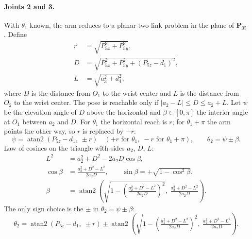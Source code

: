\documentclass[11pt]{article}
\newcommand{\atantwo}{\operatorname{atan2}}
\begin{document}
\paragraph{Joints 2 and 3.} With $\theta_1$ known, the arm reduces to a planar two-link problem in the plane of $\bm{P}_{05}$. Define
\begin{align}
r &= \sqrt{P_{5x}^2+P_{5y}^2}, \\
D &= \sqrt{P_{5x}^2+P_{5y}^2+(P_{5z}-d_1)^2}, \\
L &= \sqrt{a_3^2+d_4^2},
\end{align}
where $D$ is the distance from $O_1$ to the wrist center and $L$ is the distance from $O_2$ to the wrist center. The pose is reachable only if $|a_2-L|\le D\le a_2+L$. Let $\psi$ be the elevation angle of $D$ above the horizontal and $\beta\in[0,\pi]$ the interior angle at $O_1$ between $a_2$ and $D$. For $\theta_1$ the horizontal reach is $r$; for $\theta_1+\pi$ the arm points the other way, so $r$ is replaced by $-r$:
\begin{equation}
\psi = \atantwo\!\left(P_{5z}-d_1,\; \pm r\right) \quad (+r \text{ for } \theta_1,\; -r \text{ for } \theta_1+\pi), \qquad \theta_2 = \psi \pm \beta .
\end{equation}
Law of cosines on the triangle with sides $a_2$, $D$, $L$:
\begin{align}
L^2 &= a_2^2 + D^2 - 2a_2 D\cos\beta, \\
\cos\beta &= \frac{a_2^2+D^2-L^2}{2a_2D}, \qquad
\sin\beta = +\sqrt{1-\cos^2\beta}, \\
\beta &= \atantwo\!\left(\sqrt{1-\left(\tfrac{a_2^2+D^2-L^2}{2a_2D}\right)^{2}},\; \tfrac{a_2^2+D^2-L^2}{2a_2D}\right).
\end{align}
The only sign choice is the $\pm$ in $\theta_2=\psi\pm\beta$:
\begin{equation}
\theta_2 = \atantwo\!\left(P_{5z}-d_1,\; \pm r\right) \pm \atantwo\!\left(\sqrt{1-\left(\tfrac{a_2^2+D^2-L^2}{2a_2D}\right)^{2}},\; \tfrac{a_2^2+D^2-L^2}{2a_2D}\right).
\end{equation}
\end{document}
